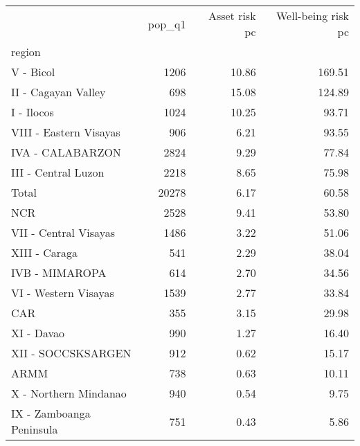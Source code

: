 \begin{tabular}{lrrr}
\toprule
{} &  pop\_q1 &  Asset risk pc &  Well-being risk pc \\
region                   &         &                &                     \\
\midrule
V - Bicol                &    1206 &          10.86 &              169.51 \\
II - Cagayan Valley      &     698 &          15.08 &              124.89 \\
I - Ilocos               &    1024 &          10.25 &               93.71 \\
VIII - Eastern Visayas   &     906 &           6.21 &               93.55 \\
IVA - CALABARZON         &    2824 &           9.29 &               77.84 \\
III - Central Luzon      &    2218 &           8.65 &               75.98 \\
Total                    &   20278 &           6.17 &               60.58 \\
NCR                      &    2528 &           9.41 &               53.80 \\
VII - Central Visayas    &    1486 &           3.22 &               51.06 \\
XIII - Caraga            &     541 &           2.29 &               38.04 \\
IVB - MIMAROPA           &     614 &           2.70 &               34.56 \\
VI - Western Visayas     &    1539 &           2.77 &               33.84 \\
CAR                      &     355 &           3.15 &               29.98 \\
XI - Davao               &     990 &           1.27 &               16.40 \\
XII - SOCCSKSARGEN       &     912 &           0.62 &               15.17 \\
ARMM                     &     738 &           0.63 &               10.11 \\
X - Northern Mindanao    &     940 &           0.54 &                9.75 \\
IX - Zamboanga Peninsula &     751 &           0.43 &                5.86 \\
\bottomrule
\end{tabular}
